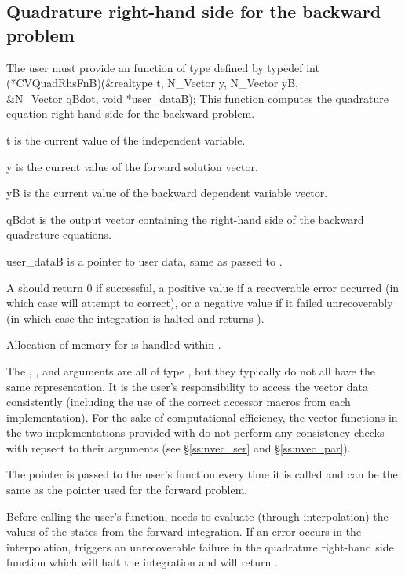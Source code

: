 \subsection{Quadrature right-hand side for the backward problem}
\label{sss:rhs_quad_B}
The user must provide an  function of type  defined by
{
  typedef int (*CVQuadRhsFnB)(&realtype t, N\_Vector y, N\_Vector yB, \\
                              &N\_Vector qBdot, void *user\_dataB);
}
{
  This function computes the quadrature equation right-hand side for the
  backward problem.
}
{
  \begin{args}
  \item[t]
    is the current value of the independent variable.
  \item[y]
    is the current value of the forward solution vector.
  \item[yB]
    is the current value of the backward dependent variable vector.
  \item[qBdot]
    is the output vector containing the right-hand side  of the backward
    quadrature equations.
  \item[user\_dataB]
    is a pointer to user data, same as passed to .
  \end{args}
}
{
  A  should return 0 if successful, a positive value if a recoverable
  error occurred (in which case {\cvodes} will attempt to correct), or a negative
  value if it failed unrecoverably (in which case the integration is halted and
   returns ).
}
{
  Allocation of memory for  is handled within {\cvodes}.

  The , , and  arguments are all of type ,
  but they typically do not all have the same representation. It is the user's
  responsibility to access the vector data consistently (including the use of the
  correct accessor macros from each {\nvector} implementation). For the sake of
  computational efficiency, the vector functions in the two {\nvector} implementations
  provided with {\cvodes} do not perform any consistency checks with repsect to their
   arguments (see \S\ref{ss:nvec_ser} and \S\ref{ss:nvec_par}).

  The  pointer is passed to the user's  function every time
  it is called and can be the same as the  pointer used for the forward problem.

  {\warn}Before calling the user's  function, {\cvodes} needs to evaluate
  (through interpolation) the values of the states from the forward integration.
  If an error occurs in the interpolation, {\cvodes} triggers an unrecoverable
  failure in the quadrature right-hand side function which will halt the integration and
   will return .
}

